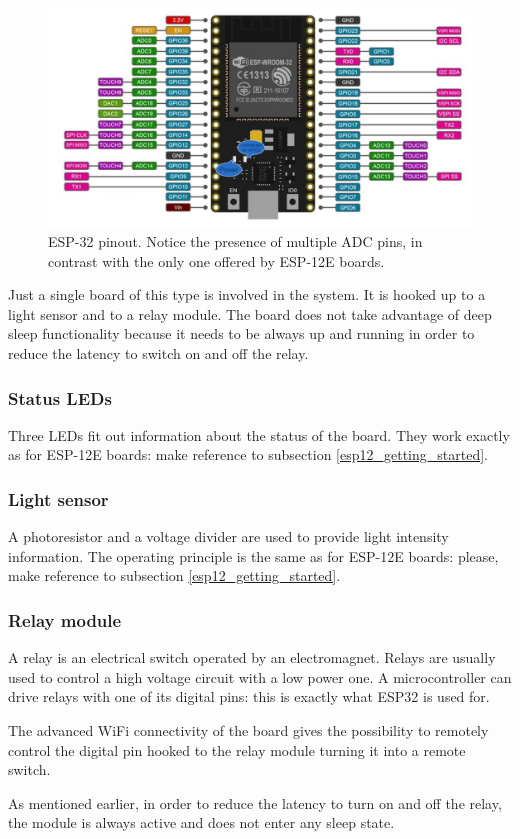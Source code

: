 \begin{figure}[H]
	\begin{center}
		\includegraphics[width=\textwidth]{./pictures/ESP-32_pinout.JPG}
		\caption{ESP-32 pinout. Notice the presence of multiple ADC pins, in contrast with the only one offered by ESP-12E boards.}
		\label{esp32_pinout}
	\end{center}
\end{figure}

\noindent
Just a single board of this type is involved in the system. It is hooked up to a light sensor and to a relay module. The board does not take advantage of deep sleep functionality because it needs to be always up and running in order to reduce the latency to switch on and off the relay.

\subsubsection{Status LEDs}
Three LEDs fit out information about the status of the board. They work exactly as for ESP-12E boards: make reference to subsection \ref{esp12_getting_started}.

\subsubsection{Light sensor}
A photoresistor and a voltage divider are used to provide light intensity information. The operating principle is the same as for ESP-12E boards: please, make reference to subsection \ref{esp12_getting_started}.

\subsubsection{Relay module}
A relay is an electrical switch operated by an electromagnet. Relays are usually used to control a high voltage circuit with a low power one. A microcontroller can drive relays with one of its digital pins: this is exactly what ESP32 is used for.

The advanced WiFi connectivity of the board gives the possibility to remotely control the digital pin hooked to the relay module turning it into a remote switch.

As mentioned earlier, in order to reduce the latency to turn on and off the relay, the module is always active and does not enter any sleep state.

